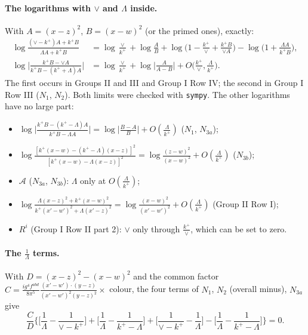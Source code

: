 \documentclass[10pt]{article}
\numberwithin{equation}{section}
\begin{document}
\paragraph{The logarithms with $\vee$ and $\Lambda$ inside.} With $A=(x-z)^2$, $B=(x-w)^2$ (or the primed ones), exactly:
\begin{align}
\log\frac{(\vee-k^+)A+k^+B}{\Lambda A+k^+B}&=\log\frac{\vee}{k^+}+\log\frac{A}{B}+\log\Big(1-\frac{k^+}{\vee}+\frac{k^+B}{\vee A}\Big)-\log\Big(1+\frac{\Lambda A}{k^+B}\Big),\label{eq:asI}\\
\log\Big|\frac{k^+B-\vee A}{k^+B-(k^++\Lambda)A}\Big|&=\log\frac{\vee}{k^+}+\log\Big|\frac{A}{A-B}\Big|+O\Big(\frac{k^+}{\vee},\frac{\Lambda}{k^+}\Big).\label{eq:asIII}
\end{align}
The first occurs in Groups II and III and Group I Row IV; the second in Group I Row III ($N_1$, $N_2$). Both limits were checked with \texttt{sympy}. The other logarithms have no large part:
\begin{itemize}
\item $\log\big|\frac{k^+B-(k^+-\Lambda)A}{k^+B-\Lambda A}\big|=\log\big|\frac{B-A}{B}\big|+O(\frac{\Lambda}{k^+})$ ($N_1$, $N_{3a}$);
\item $\log\frac{[k^+(x-w)-(k^+-\Lambda)(x-z)]^2}{[k^+(x-w)-\Lambda(x-z)]^2}=\log\frac{(z-w)^2}{(x-w)^2}+O(\frac{\Lambda}{k^+})$ ($N_{3b}$);
\item $\mathcal A$ ($N_{3a}$, $N_{3b}$): $\Lambda$ only at $O(\frac{\Lambda}{k^+})$;
\item $\log\frac{\Lambda(x-z)^2+k^+(x-w)^2}{k^+(x'-w')^2+\Lambda(x'-z)^2}=\log\frac{(x-w)^2}{(x'-w')^2}+O(\frac{\Lambda}{k^+})$ (Group II Row I);
\item $R^i$ (Group I Row II part 2): $\vee$ only through $\frac{k^+}{\vee}$, which can be set to zero.
\end{itemize}
\paragraph{The $\frac1\Lambda$ terms.} With $D=(x-z)^2-(x-w)^2$ and the common factor $C=\frac{ig^4f^{abd}}{8\pi^5}\frac{(x'-w')\cdot(y-z)}{(x'-w')^2(y-z)^2}\times$ colour, the four terms of $N_1$, $N_2$ (overall minus), $N_{3a}$ give
\begin{equation}
\frac{C}{D}\Big\{\Big[\frac1\Lambda-\frac{1}{\vee-k^+}\Big]+\Big[\frac1\Lambda-\frac{1}{k^+-\Lambda}\Big]+\Big[\frac{1}{\vee-k^+}-\frac1\Lambda\Big]-\Big[\frac1\Lambda-\frac{1}{k^+-\Lambda}\Big]\Big\}=0 .
\label{eq:green}
\end{equation}
\end{document}
